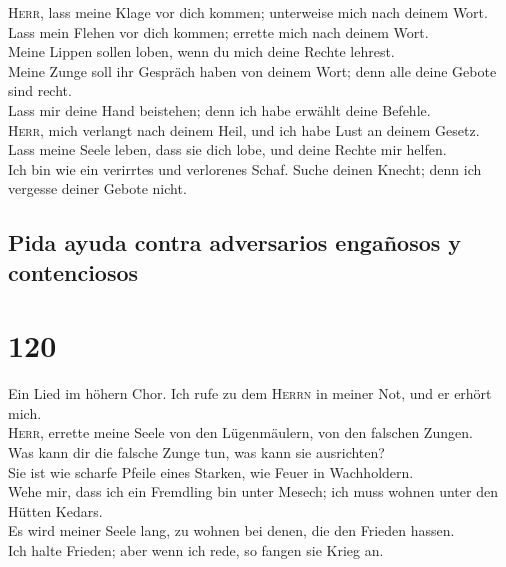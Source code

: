  \textsc{Herr}, lass meine Klage vor dich kommen;
unterweise mich nach deinem Wort.\\
 Lass mein Flehen vor dich kommen; errette mich nach
deinem Wort.\\
 Meine Lippen sollen loben, wenn du mich deine Rechte
lehrest.\\
 Meine Zunge soll ihr Gespräch haben von deinem Wort;
denn alle deine Gebote sind recht.\\
 Lass mir deine Hand beistehen; denn ich habe erwählt
deine Befehle.\\
 \textsc{Herr}, mich verlangt nach deinem Heil, und ich
habe Lust an deinem Gesetz.\\
 Lass meine Seele leben, dass sie dich lobe, und deine
Rechte mir helfen.\\
 Ich bin wie ein verirrtes und verlorenes Schaf. Suche
deinen Knecht; denn ich vergesse deiner Gebote nicht.

\hypertarget{pida-ayuda-contra-adversarios-engauxf1osos-y-contenciosos}{%
\subsection{Pida ayuda contra adversarios engañosos y
contenciosos}\label{pida-ayuda-contra-adversarios-engauxf1osos-y-contenciosos}}

\hypertarget{section-119}{%
\section{120}\label{section-119}}

 Ein Lied im höhern Chor. Ich rufe zu dem \textsc{Herrn}
in meiner Not, und er erhört mich.\\
 \textsc{Herr}, errette meine Seele von den Lügenmäulern,
von den falschen Zungen.\\
 Was kann dir die falsche Zunge tun, was kann sie
ausrichten?\\
 Sie ist wie scharfe Pfeile eines Starken, wie Feuer in
Wachholdern.\\
 Wehe mir, dass ich ein Fremdling bin unter Mesech; ich
muss wohnen unter den Hütten Kedars.\\
 Es wird meiner Seele lang, zu wohnen bei denen, die den
Frieden hassen.\\
 Ich halte Frieden; aber wenn ich rede, so fangen sie
Krieg an.

